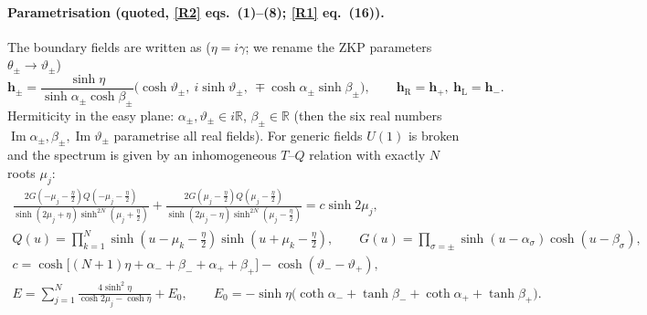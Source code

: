 \documentclass[11pt,a4paper]{article}
\theoremstyle{definition}
\newcommand{\hL}{\mathbf h_{\mathrm L}}
\newcommand{\hR}{\mathbf h_{\mathrm R}}
\newcommand{\im}{\operatorname{Im}}
\begin{document}
\paragraph{Parametrisation (quoted, \ref{R2} eqs.~(1)--(8); \ref{R1} eq.~(16)).} The boundary fields are written as ($\eta=i\gamma$; we rename the ZKP parameters $\theta_\pm\to\vartheta_\pm$)
\begin{equation}\label{eq:ZKPfields}
\mathbf h_{\pm}=\frac{\sinh\eta}{\sinh\alpha_\pm\cosh\beta_\pm}\Big(\cosh\vartheta_\pm,\ i\sinh\vartheta_\pm,\ \mp\cosh\alpha_\pm\sinh\beta_\pm\Big),\qquad \hR=\mathbf h_+,\ \hL=\mathbf h_-.
\end{equation}
Hermiticity in the easy plane: $\alpha_\pm,\vartheta_\pm\in i\mathbb R$, $\beta_\pm\in\mathbb R$ (then the six real numbers $\im\alpha_\pm,\beta_\pm,\im\vartheta_\pm$ parametrise all real fields). For generic fields $U(1)$ is broken and the spectrum is given by an inhomogeneous $T$--$Q$ relation with exactly $N$ roots $\mu_j$:
\begin{gather}
\frac{2G(-\mu_j-\frac\eta2)Q(-\mu_j-\frac\eta2)}{\sinh(2\mu_j+\eta)\sinh^{2N}(\mu_j+\frac\eta2)}+\frac{2G(\mu_j-\frac\eta2)Q(\mu_j-\frac\eta2)}{\sinh(2\mu_j-\eta)\sinh^{2N}(\mu_j-\frac\eta2)}=c\sinh2\mu_j,\label{eq:BAEopen}\\
Q(u)=\prod_{k=1}^N\sinh(u-\mu_k-\tfrac\eta2)\sinh(u+\mu_k-\tfrac\eta2),\qquad G(u)=\prod_{\sigma=\pm}\sinh(u-\alpha_\sigma)\cosh(u-\beta_\sigma),\nonumber\\
c=\cosh\!\big[(N+1)\eta+\alpha_-+\beta_-+\alpha_++\beta_+\big]-\cosh(\vartheta_--\vartheta_+),\nonumber\\
E=\sum_{j=1}^N\frac{4\sinh^2\eta}{\cosh2\mu_j-\cosh\eta}+E_0,\qquad E_0=-\sinh\eta\big(\coth\alpha_-+\tanh\beta_-+\coth\alpha_++\tanh\beta_+\big).\label{eq:BAEopen-E}
\end{gather}
\end{document}
